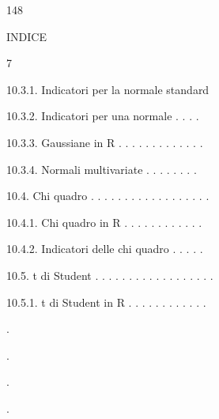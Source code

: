 \documentclass[a4paper,portrait,12pt]{article}
\begin{document}
148





\begin{flushleft}
\newpage
INDICE
\end{flushleft}





7





\begin{flushleft}
10.3.1. Indicatori per la normale standard
\end{flushleft}


\begin{flushleft}
10.3.2. Indicatori per una normale . . . .
\end{flushleft}


\begin{flushleft}
10.3.3. Gaussiane in R . . . . . . . . . . . . .
\end{flushleft}


\begin{flushleft}
10.3.4. Normali multivariate . . . . . . . .
\end{flushleft}


\begin{flushleft}
10.4. Chi quadro . . . . . . . . . . . . . . . . . .
\end{flushleft}


\begin{flushleft}
10.4.1. Chi quadro in R . . . . . . . . . . . .
\end{flushleft}


\begin{flushleft}
10.4.2. Indicatori delle chi quadro . . . . .
\end{flushleft}


\begin{flushleft}
10.5. t di Student . . . . . . . . . . . . . . . . . .
\end{flushleft}


\begin{flushleft}
10.5.1. t di Student in R . . . . . . . . . . . .
\end{flushleft}





.


.


.


.
\end{document}

